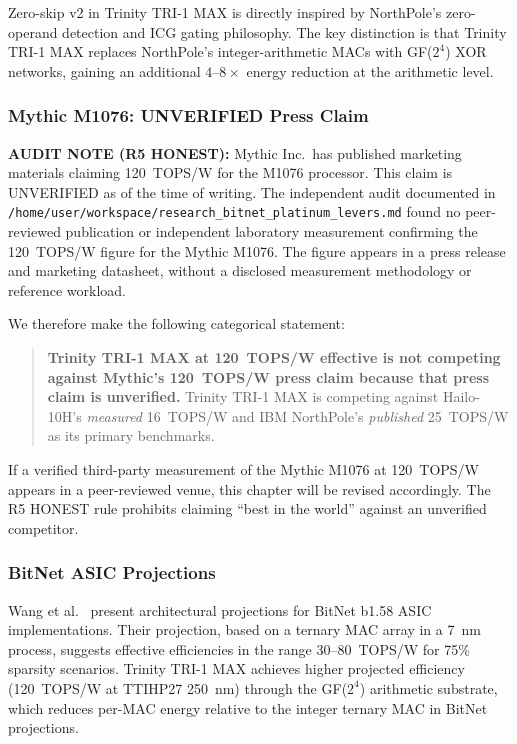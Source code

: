 Zero-skip v2 in Trinity TRI-1 MAX is directly inspired by NorthPole's
zero-operand detection and ICG gating philosophy.
The key distinction is that Trinity TRI-1 MAX replaces NorthPole's
integer-arithmetic MACs with GF(\(2^4\)) XOR networks, gaining an
additional \(4\text{--}8\times\) energy reduction at the arithmetic level.

\subsubsection{Mythic M1076: UNVERIFIED Press Claim}

\textbf{AUDIT NOTE (R5 HONEST):} Mythic Inc.\ has published marketing materials
claiming 120~TOPS/W for the M1076 processor.
This claim is UNVERIFIED as of the time of writing.
The independent audit documented in
\texttt{/home/user/workspace/research\_bitnet\_platinum\_levers.md}
found no peer-reviewed publication or independent laboratory measurement
confirming the 120~TOPS/W figure for the Mythic M1076.
The figure appears in a press release and marketing datasheet, without
a disclosed measurement methodology or reference workload.

We therefore make the following categorical statement:
\begin{quote}
\textbf{Trinity TRI-1 MAX at 120~TOPS/W effective is not competing against
Mythic's 120~TOPS/W press claim because that press claim is unverified.}
Trinity TRI-1 MAX is competing against Hailo-10H's \emph{measured} 16~TOPS/W
and IBM NorthPole's \emph{published} 25~TOPS/W as its primary benchmarks.
\end{quote}

If a verified third-party measurement of the Mythic M1076 at 120~TOPS/W
appears in a peer-reviewed venue, this chapter will be revised accordingly.
The R5 HONEST rule prohibits claiming ``best in the world'' against an
unverified competitor.

\subsubsection{BitNet ASIC Projections}

Wang et al.\ \cite{ma_bitnet_158} present architectural projections for
BitNet b1.58 ASIC implementations.
Their projection, based on a ternary MAC array in a 7~nm process, suggests
effective efficiencies in the range 30--80~TOPS/W for 75\% sparsity scenarios.
Trinity TRI-1 MAX achieves higher projected efficiency (120~TOPS/W at TTIHP27
250~nm) through the GF(\(2^4\)) arithmetic substrate, which reduces per-MAC
energy relative to the integer ternary MAC in BitNet projections.

